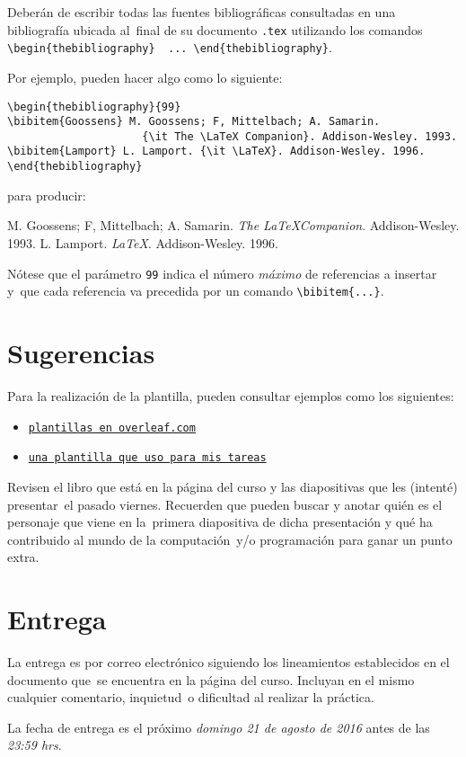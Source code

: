 \documentclass[paper=letter, fontsize=12pt]{scrartcl}
\begin{document}
Deberán de escribir todas las fuentes bibliográficas consultadas en una bibliografía ubicada al\
final de su documento \texttt{.tex} utilizando los comandos\\
\verb+\begin{thebibliography}  ... \end{thebibliography}+.\par
Por ejemplo, pueden hacer algo como lo siguiente:
\begin{verbatim}
\begin{thebibliography}{99}
\bibitem{Goossens} M. Goossens; F, Mittelbach; A. Samarin.
                     {\it The \LaTeX Companion}. Addison-Wesley. 1993.
\bibitem{Lamport} L. Lamport. {\it \LaTeX}. Addison-Wesley. 1996.
\end{thebibliography}
\end{verbatim}
para producir:
\begin{thebibliography}{99}
 M. Goossens; F, Mittelbach; A. Samarin.
  {\it The \LaTeX Companion}. Addison-Wesley. 1993.
 L. Lamport. {\it \LaTeX}. Addison-Wesley. 1996.
\end{thebibliography}\par
Nótese que el parámetro \texttt{99} indica el número \emph{máximo} de referencias a insertar y\
que cada referencia va precedida por un comando \verb+\bibitem{...}+.

\section*{Sugerencias}

\noindent
Para la realización de la plantilla, pueden consultar ejemplos como los siguientes:
\begin{itemize}
\item \texttt{\href{https://www.overleaf.com/gallery/tagged/homework\#.V7pPbGXMzFI}
  {plantillas en overleaf.com}}
\item \texttt{\href{https://www.dropbox.com/s/cxenfopmt9qzfk1/assignment_3.tex?dl=0}
  {una plantilla que uso para mis tareas}}
\end{itemize}\par
Revisen el libro que está en la página del curso y las diapositivas que les (intenté) presentar\
el pasado viernes. Recuerden que pueden buscar y anotar quién es el personaje que viene en la\
primera diapositiva de dicha presentación y qué ha contribuido al mundo de la computación\
y/o programación para ganar un punto extra.

\section*{Entrega}

La entrega es por correo electrónico siguiendo los lineamientos establecidos en el documento que\
se encuentra en la página del curso. Incluyan en el mismo cualquier comentario, inquietud\
o dificultad al realizar la práctica.\par
La fecha de entrega es el próximo \emph{domingo 21 de agosto de 2016} antes de las \emph{23:59 hrs}.
\end{document}

